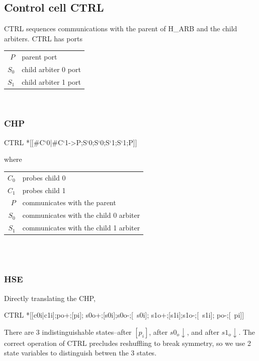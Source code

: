 \documentclass[aer.tex]{subfiles}
\begin{document}
\subsection{Control cell CTRL}
CTRL sequences communications with the parent of H\_ARB and the child arbiters.
CTRL has ports

\begin{tabular}[]{rl}
$P$ & parent port \\
$S_0$ & child arbiter 0 port \\
$S_1$ & child arbiter 1 port \\
\end{tabular} \\

\subsubsection*{CHP}

\begin{csp}
CTRL\equiv
  *[[#{C`0}|#{C`1}->P;S`0;S`0;S`1;S`1;P]]
\end{csp}

\noindent where 

\begin{tabular}[]{rl}
  $C_0$ & probes child 0 \\
  $C_1$ & probes child 1 \\
  $P$ & communicates with the parent \\
  $S_0$ & communicates with the child 0 arbiter \\
  $S_1$ & communicates with the child 1 arbiter \\
\end{tabular} \\ \\

\subsubsection*{HSE}

\noindent Directly translating the CHP,

\begin{hse}
CTRL\equiv
  *[[c0i|c1i];po+;[pi];
    s0o+;[s0i];s0o-;[~s0i];
    s1o+;[s1i];s1o-;[~s1i];
    po-;[~pi]]
\end{hse}

\noindent There are 3 indistinguishable states--after $[p_i]$, after $s0_o\!\downarrow$, and after $s1_o\!\downarrow$. The correct operation of CTRL precludes reshuffling to break symmetry, so we use 2 state variables to distinguish betwen the 3 states.
\end{document}
